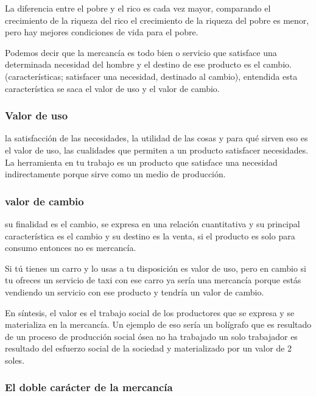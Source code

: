 \documentclass[
  letterpaper,
  DIV=11,
  numbers=noendperiod]{scrartcl}
\begin{document}
La diferencia entre el pobre y el rico es cada vez mayor, comparando el
crecimiento de la riqueza del rico el crecimiento de la riqueza del
pobre es menor, pero hay mejores condiciones de vida para el pobre.

Podemos decir que la mercancía es todo bien o servicio que satisface una
determinada necesidad del hombre y el destino de ese producto es el
cambio. (características; satisfacer una necesidad, destinado al
cambio), entendida esta característica se saca el valor de uso y el
valor de cambio.

\hypertarget{valor-de-uso}{%
\subsubsection{Valor de uso}\label{valor-de-uso}}

la satisfacción de las necesidades, la utilidad de las cosas y para qué
sirven eso es el valor de uso, las cualidades que permiten a un producto
satisfacer necesidades. La herramienta en tu trabajo es un producto que
satisface una necesidad indirectamente porque sirve como un medio de
producción.

\hypertarget{valor-de-cambio}{%
\subsubsection{valor de cambio}\label{valor-de-cambio}}

su finalidad es el cambio, se expresa en una relación cuantitativa y su
principal característica es el cambio y su destino es la venta, si el
producto es solo para consumo entonces no es mercancía.

Si tú tienes un carro y lo usas a tu disposición es valor de uso, pero
en cambio si tu ofreces un servicio de taxi con ese carro ya sería una
mercancía porque estás vendiendo un servicio con ese producto y tendría
un valor de cambio.

En síntesis, el valor es el trabajo social de los productores que se
expresa y se materializa en la mercancía. Un ejemplo de eso sería un
bolígrafo que es resultado de un proceso de producción social ósea no ha
trabajado un solo trabajador es resultado del esfuerzo social de la
sociedad y materializado por un valor de 2 soles.

\hypertarget{el-doble-caruxe1cter-de-la-mercancuxeda}{%
\subsubsection{El doble carácter de la
mercancía}\label{el-doble-caruxe1cter-de-la-mercancuxeda}}
\end{document}
